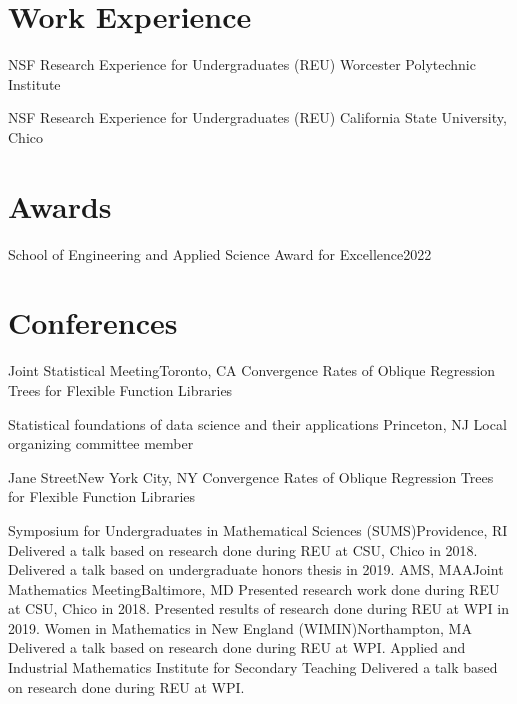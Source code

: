 \documentclass[10pt,a4paper,roman]{moderncv}        %
\begin{document}
\section{Work Experience}
{NSF Research Experience for Undergraduates (REU) }
{Worcester Polytechnic Institute}
{} {
}

{NSF Research Experience for Undergraduates (REU)}
{California State University, Chico}
{}
{}

\section{Awards}
{School of Engineering and Applied Science Award for Excellence}{2022}
{}{}

\section{Conferences}
{Joint Statistical Meeting}{Toronto, CA}
{}{Convergence Rates of Oblique Regression Trees for Flexible Function Libraries}

{Statistical foundations of data science and their applications}
{Princeton, NJ}
{}{Local organizing committee member}

{Jane Street}{New York City, NY}
{}{Convergence Rates of Oblique Regression Trees for Flexible Function Libraries}

{Symposium for Undergraduates in Mathematical Sciences (SUMS)}{Providence, RI}
{}{Delivered a talk based on research done during REU at CSU, Chico in 2018.
  Delivered a talk based on undergraduate honors thesis in 2019.}
{AMS, MAA}{Joint Mathematics Meeting}{Baltimore, MD}
{}{Presented research work done during REU at CSU, Chico in 2018.
  Presented results of research done during REU at WPI in 2019.}
{Women in Mathematics in New England (WIMIN)}{Northampton, MA}
{}{Delivered a talk based on research done during REU at WPI.}
{Applied and Industrial Mathematics Institute for Secondary Teaching}
{Delivered a talk based on research done during REU at WPI.}
\end{document}
